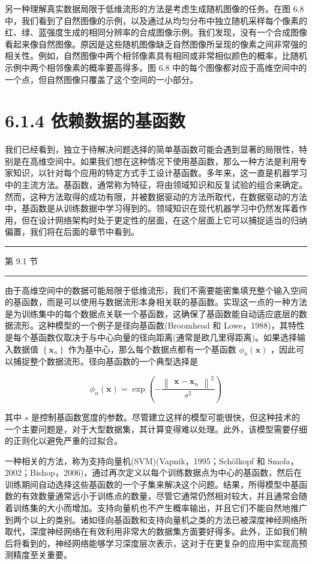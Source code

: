 \documentclass[10pt]{article}
\newcommand{\HRule}{\begin{center}\rule{0.9\linewidth}{0.2mm}\end{center}}
\begin{document}
另一种理解真实数据局限于低维流形的方法是考虑生成随机图像的任务。在图 6.8 中，我们看到了自然图像的示例，以及通过从均匀分布中独立随机采样每个像素的红、绿、蓝强度生成的相同分辨率的合成图像示例。我们发现，没有一个合成图像看起来像自然图像。原因是这些随机图像缺乏自然图像所呈现的像素之间非常强的相关性。例如，自然图像中两个相邻像素具有相同或非常相似颜色的概率，比随机示例中两个相邻像素的概率要高得多。图 6.8 中的每个图像都对应于高维空间中的一个点，但自然图像只覆盖了这个空间的一小部分。

\section*{6.1.4 依赖数据的基函数}

我们已经看到，独立于待解决问题选择的简单基函数可能会遇到显著的局限性，特别是在高维空间中。如果我们想在这种情况下使用基函数，那么一种方法是利用专家知识，以针对每个应用的特定方式手工设计基函数。多年来，这一直是机器学习中的主流方法。基函数，通常称为特征，将由领域知识和反复试验的组合来确定。然而，这种方法取得的成功有限，并被数据驱动的方法所取代，在数据驱动的方法中，基函数是从训练数据中学习得到的。领域知识在现代机器学习中仍然发挥着作用，但在设计网络架构时处于更定性的层面，在这个层面上它可以捕捉适当的归纳偏置，我们将在后面的章节中看到。

\HRule

第 9.1 节

\HRule

由于高维空间中的数据可能局限于低维流形，我们不需要能密集填充整个输入空间的基函数，而是可以使用与数据流形本身相关联的基函数。实现这一点的一种方法是为训练集中的每个数据点关联一个基函数，这确保了基函数能自动适应底层的数据流形。这种模型的一个例子是径向基函数(Broomhead 和 Lowe，1988)，其特性是每个基函数仅取决于与中心向量的径向距离(通常是欧几里得距离)。如果选择输入数据值 \(\left\{  {\mathbf{x}}_{n}\right\}\) 作为基中心，那么每个数据点都有一个基函数 \({\phi }_{n}\left( \mathbf{x}\right)\) ，因此可以捕捉整个数据流形。径向基函数的一个典型选择是

\[
{\phi }_{n}\left( \mathbf{x}\right)  = \exp \left( {-\frac{{\begin{Vmatrix}\mathbf{x} - {\mathbf{x}}_{n}\end{Vmatrix}}^{2}}{{s}^{2}}}\right)  \tag{6.6}
\]

其中 \(s\) 是控制基函数宽度的参数。尽管建立这样的模型可能很快，但这种技术的一个主要问题是，对于大型数据集，其计算变得难以处理。此外，该模型需要仔细的正则化以避免严重的过拟合。

一种相关的方法，称为支持向量机(SVM)(Vapnik，1995；Schölkopf 和 Smola，2002；Bishop，2006)，通过再次定义以每个训练数据点为中心的基函数，然后在训练期间自动选择这些基函数的一个子集来解决这个问题。结果，所得模型中基函数的有效数量通常远小于训练点的数量，尽管它通常仍然相对较大，并且通常会随着训练集的大小而增加。支持向量机也不产生概率输出，并且它们不能自然地推广到两个以上的类别。诸如径向基函数和支持向量机之类的方法已被深度神经网络所取代，深度神经网络在有效利用非常大的数据集方面要好得多。此外，正如我们稍后将看到的，神经网络能够学习深度层次表示，这对于在更复杂的应用中实现高预测精度至关重要。
\end{document}
